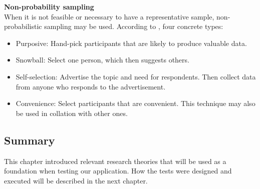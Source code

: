 \textbf{Non-probability sampling} \\
When it is not feasible or necessary to have a representative sample, non-probabilistic sampling may be used. According to \citeauthor{oates_researching_2006}, four concrete types:
\begin{itemize}
    \item Purposive: Hand-pick participants that are likely to produce valuable data.
    \item Snowball: Select one person, which then suggests others.
    \item Self-selection: Advertise the topic and need for respondents. Then collect data from anyone who responds to the advertisement.
    \item Convenience: Select participants that are convenient. This technique may also be used in collation with other ones.
\end{itemize}

\subsection{Summary}
This chapter introduced relevant research theories that will be used as a foundation when testing our application. How the tests were designed and executed will be described in the next chapter.